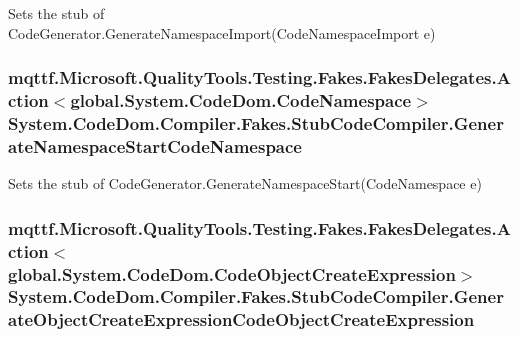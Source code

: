 Sets the stub of Code\-Generator.\-Generate\-Namespace\-Import(\-Code\-Namespace\-Import e)

\hypertarget{class_system_1_1_code_dom_1_1_compiler_1_1_fakes_1_1_stub_code_compiler_a63f58c0d163765c6a0765f11a476bb21}{
\subsubsection[{Generate\-Namespace\-Start\-Code\-Namespace}]{\setlength{\rightskip}{0pt plus 5cm}mqttf.\-Microsoft.\-Quality\-Tools.\-Testing.\-Fakes.\-Fakes\-Delegates.\-Action$<$global.\-System.\-Code\-Dom.\-Code\-Namespace$>$ System.\-Code\-Dom.\-Compiler.\-Fakes.\-Stub\-Code\-Compiler.\-Generate\-Namespace\-Start\-Code\-Namespace}}\label{class_system_1_1_code_dom_1_1_compiler_1_1_fakes_1_1_stub_code_compiler_a63f58c0d163765c6a0765f11a476bb21}


Sets the stub of Code\-Generator.\-Generate\-Namespace\-Start(\-Code\-Namespace e)

\hypertarget{class_system_1_1_code_dom_1_1_compiler_1_1_fakes_1_1_stub_code_compiler_aaaab300ae1eb1078bbdc62498b89fddf}{
\subsubsection[{Generate\-Object\-Create\-Expression\-Code\-Object\-Create\-Expression}]{\setlength{\rightskip}{0pt plus 5cm}mqttf.\-Microsoft.\-Quality\-Tools.\-Testing.\-Fakes.\-Fakes\-Delegates.\-Action$<$global.\-System.\-Code\-Dom.\-Code\-Object\-Create\-Expression$>$ System.\-Code\-Dom.\-Compiler.\-Fakes.\-Stub\-Code\-Compiler.\-Generate\-Object\-Create\-Expression\-Code\-Object\-Create\-Expression}}\label{class_system_1_1_code_dom_1_1_compiler_1_1_fakes_1_1_stub_code_compiler_aaaab300ae1eb1078bbdc62498b89fddf}


